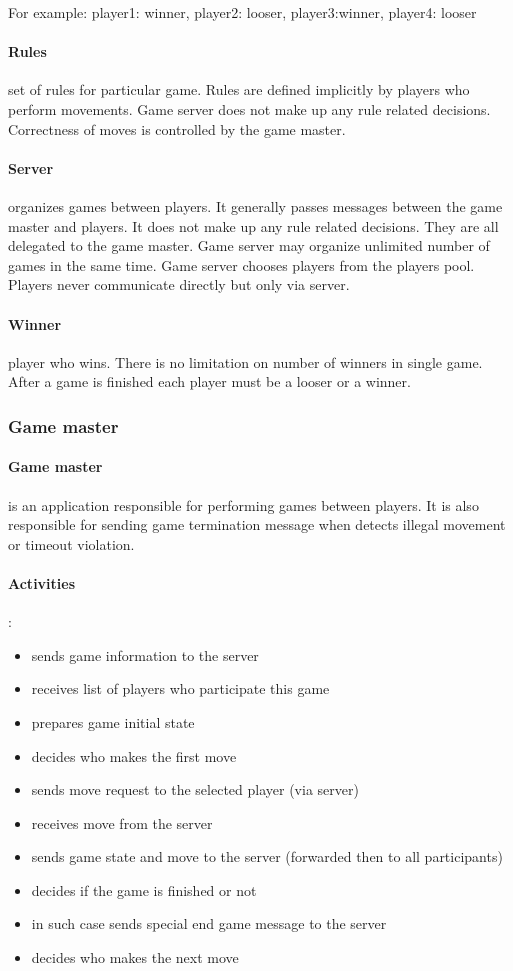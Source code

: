 \documentclass{article}
\begin{document}
For example: player1: winner, player2: looser, player3:winner, player4: looser

\paragraph{Rules} set of rules for particular game. Rules are defined implicitly by players 
who perform movements. Game server does not make up any rule related decisions. 
Correctness of moves is controlled by the game master.

\paragraph{Server} organizes games between players. It generally passes messages between 
the game master and players. It does not make up any rule related decisions. 
They are all delegated to the game master. Game server may organize unlimited number of games 
in the same time. Game server chooses players from the players pool. Players never communicate 
directly but only via server.

\paragraph{Winner} player who wins. There is no limitation on number of winners in single game. 
After a game is finished each player must be a looser or a winner.

\subsubsection{Game master}

\paragraph{Game master} is an application responsible for performing games between players. It is also responsible 
for sending game termination message when detects illegal movement or timeout violation.

\paragraph{Activities} :
\begin{itemize}
  \item sends game information to the server
  \item receives list of players who participate this game
  \item prepares game initial state
  \item decides who makes the first move
  \item sends move request to the selected player (via server)
  \item receives move from the server
  \item sends game state and move to the server (forwarded then to all
  participants)
  \item decides if the game is finished or not
  \item in such case sends special end game message to the server
  \item decides who makes the next move
\end{itemize}
\end{document}
